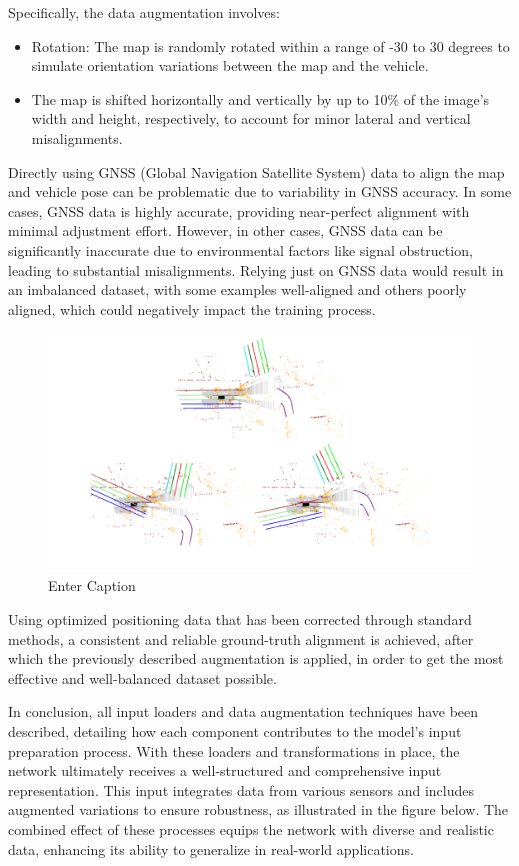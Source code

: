 Specifically, the data augmentation involves:
\begin{itemize}
    \item Rotation: The map is randomly rotated within a range of -30 to 30 degrees to simulate orientation variations between the map and the vehicle.
    \item The map is shifted horizontally and vertically by up to 10\% of the image’s width and height, respectively, to account for minor lateral and vertical misalignments.
\end{itemize}

Directly using GNSS (Global Navigation Satellite System) data to align the map and vehicle pose can be problematic due to variability in GNSS accuracy. In some cases, GNSS data is highly accurate, providing near-perfect alignment with minimal adjustment effort. However, in other cases, GNSS data can be significantly inaccurate due to environmental factors like signal obstruction, leading to substantial misalignments. Relying just on GNSS data would result in an imbalanced dataset, with some examples well-aligned and others poorly aligned, which could negatively impact the training process.
\begin{figure}[H]
    \centering
    \includegraphics[width=1\linewidth]{LateX//figs/data_augmentation_zoom.pdf}
    \caption{Enter Caption}
    \label{fig:enter-label}
\end{figure}
Using optimized positioning data that has been corrected through standard methods, a consistent and reliable ground-truth alignment is achieved, after which the previously described augmentation is applied, in order to get the most effective and well-balanced dataset possible.

In conclusion, all input loaders and data augmentation techniques have been described, detailing how each component contributes to the model's input preparation process. With these loaders and transformations in place, the network ultimately receives a well-structured and comprehensive input representation. This input integrates data from various sensors and includes augmented variations to ensure robustness, as illustrated in the figure below. The combined effect of these processes equips the network with diverse and realistic data, enhancing its ability to generalize in real-world applications.

